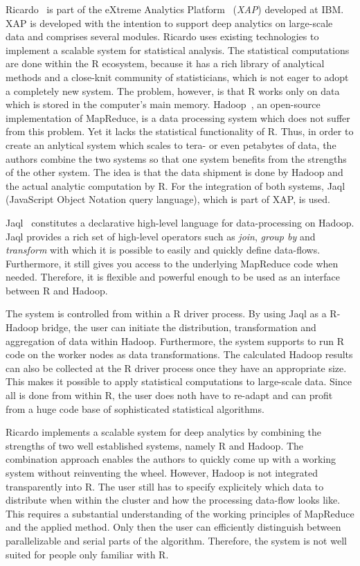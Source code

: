 Ricardo~\cite{das:2010a} is part of the eXtreme Analytics Platform~\cite{balmin:jrd2013a} (\emph{XAP}) developed at IBM.
XAP is developed with the intention to support deep analytics on large-scale data and comprises several modules.
Ricardo uses existing technologies to implement a scalable system for statistical analysis.
The statistical computations are done within the R ecosystem, because it has a rich library of analytical methods and a close-knit community of statisticians, which is not eager to adopt a completely new system.
The problem, however, is that R works only on data which is stored in the computer's main memory.
Hadoop~\cite{hadoop:2008a}, an open-source implementation of MapReduce, is a data processing system which does not suffer from this problem.
Yet it lacks the statistical functionality of R.
Thus, in order to create an anlytical system which scales to tera- or even petabytes of data, the authors combine the two systems so that one system benefits from the strengths of the other system.
The idea is that the data shipment is done by Hadoop and the actual analytic computation by R.
For the integration of both systems, Jaql (JavaScript Object Notation query language), which is part of XAP, is used.

Jaql~\cite{beyer:2011a} constitutes a declarative high-level language for data-processing on Hadoop.
Jaql provides a rich set of high-level operators such as \emph{join}, \emph{group by} and \emph{transform} with which it is possible to easily and quickly define data-flows.
Furthermore, it still gives you access to the underlying MapReduce code when needed.
Therefore, it is flexible and powerful enough to be used as an interface between R and Hadoop.

The system is controlled from within a R driver process.
By using Jaql as a R-Hadoop bridge, the user can initiate the distribution, transformation and aggregation of data within Hadoop.
Furthermore, the system supports to run R code on the worker nodes as data transformations.
The calculated Hadoop results can also be collected at the R driver process once they have an appropriate size.
This makes it possible to apply statistical computations to large-scale data.
Since all is done from within R, the user does noth have to re-adapt and can profit from a huge code base of sophisticated statistical algorithms.

Ricardo implements a scalable system for deep analytics by combining the strengths of two well established systems, namely R and Hadoop.
The combination approach enables the authors to quickly come up with a working system without reinventing the wheel.
However, Hadoop is not integrated transparently into R.
The user still has to specify explicitely which data to distribute when within the cluster and how the processing data-flow looks like.
This requires a substantial understanding of the working principles of MapReduce and the applied method.
Only then the user can efficiently distinguish between parallelizable and serial parts of the algorithm.
Therefore, the system is not well suited for people only familiar with R.

